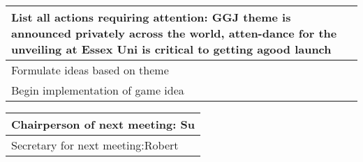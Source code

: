 \documentclass{article}
\begin{document}
\begin{table}[H]
	\centering
	\begin{tabular}{| p{12cm}  |}
	\hline
	List all actions requiring attention: 
	GGJ theme is announced privately across the world, atten-dance for the unveiling at Essex Uni is critical to getting agood launch\\ \hline
	Formulate ideas based on theme\\ \hline Begin implementation of game idea\\ \hline
\end{tabular}
\end{table}

\begin{table}[H]
	\centering
	\begin{tabular}{| p{12cm}  |}
	\hline
	Chairperson of next meeting: Su\\ \hline
	Secretary for next meeting:Robert \\ \hline
\end{tabular}
\end{table}
\end{document}
